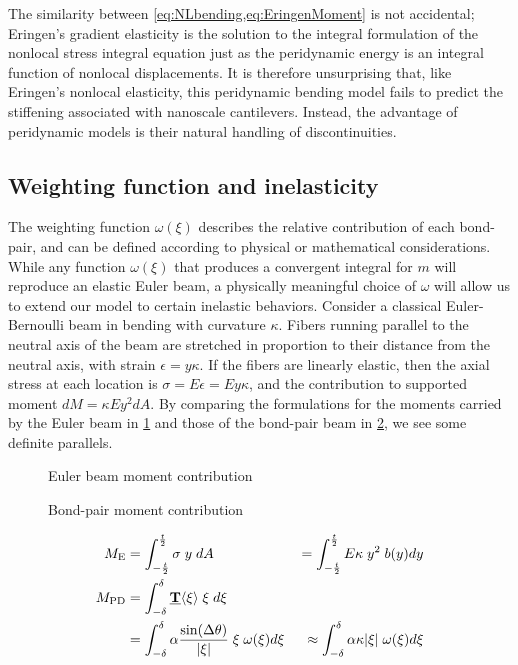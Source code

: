 The similarity between \cref{eq:NLbending,eq:EringenMoment} is not accidental; Eringen's gradient elasticity is the solution to the integral formulation of the nonlocal stress integral equation just as the peridynamic energy is an integral function of nonlocal displacements.
It is therefore unsurprising that, like Eringen's nonlocal elasticity\cite{Challamel2008small}, this peridynamic bending model fails to predict the stiffening associated with nanoscale cantilevers.
Instead, the advantage of peridynamic models is their natural handling of discontinuities.

\subsection{Weighting function and inelasticity}
\label{sec:WeightFunction}
The weighting function \(\omega(\xi)\) describes the relative contribution of each bond-pair, and can be defined according to physical or mathematical considerations. 
While any function $\omega(\xi)$ that produces a convergent integral for $m$ will reproduce an elastic Euler beam, a physically meaningful choice of $\omega$ will allow us to extend our model to certain inelastic behaviors.
Consider a classical Euler-Bernoulli beam in bending with curvature \(\kappa\). 
Fibers running parallel to the neutral axis of the beam are stretched in proportion to their distance from the neutral axis, with strain \(\epsilon = y\kappa\). 
If the fibers are linearly elastic, then the axial stress at each location is \(\sigma = E\epsilon = Ey\kappa\), and the contribution to supported moment \(dM = \kappa E y^2 dA\). 
By comparing the formulations for the moments carried by the Euler beam in \cref{fig:EulerBending} and those of the bond-pair beam in \cref{fig:BPBending}, we see some definite parallels.
%
\begin{figure}[h]
\centering
{}
\caption{Euler beam moment contribution}
\label{fig:EulerBending}
\end{figure}
%
%
\begin{figure}[h]
\centering
{}
\caption{Bond-pair moment contribution}
\label{fig:BPBending}
\end{figure}
%
\begin{align}
M_\text{E}&=\int_{-\frac{t}{2}}^{\frac{t}{2}} \sigma \; y \; dA &= \int_{-\frac{t}{2}}^{\frac{t}{2}} E \kappa \; y^2 \; b(y) dy\notag \\
%
M_\text{PD}&=\int_{-\delta}^{\delta} \vstate{T}{}{\xi}\; \xi \; d\xi &\notag \\
&= \int_{-\delta}^{\delta} \alpha \frac{\sin(\Delta\theta)}{|\xi|} \; \xi \; \omega(\xi) d\xi\: &\approx \int_{-\delta}^{\delta} \alpha \kappa |\xi| \; \omega(\xi) d\xi\notag
\end{align}
